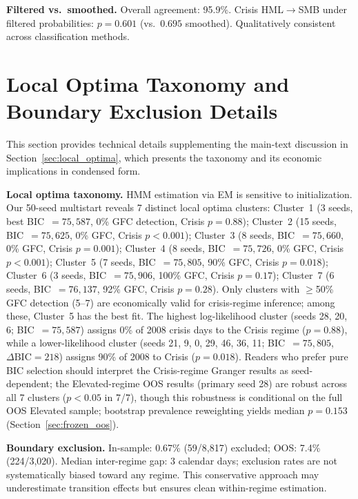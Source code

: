 \documentclass[sigconf,anonymous]{acmart}
\begin{document}
\textbf{Filtered vs.\ smoothed.} Overall agreement: 95.9\%.
Crisis HML$\to$SMB under filtered probabilities: $p = 0.601$ (vs.\ $0.695$ smoothed).
Qualitatively consistent across classification methods.

\section{Local Optima Taxonomy and Boundary Exclusion Details}
\label{app:optima}

This section provides technical details supplementing the main-text discussion in Section~\ref{sec:local_optima},
which presents the taxonomy and its economic implications in condensed form.

\textbf{Local optima taxonomy.}
HMM estimation via EM is sensitive to initialization. Our 50-seed multistart
reveals 7 distinct local optima clusters:
Cluster~1 (3 seeds, best BIC~$= 75{,}587$, 0\% GFC detection, Crisis $p = 0.88$);
Cluster~2 (15 seeds, BIC~$= 75{,}625$, 0\% GFC, Crisis $p < 0.001$);
Cluster~3 (8 seeds, BIC~$= 75{,}660$, 0\% GFC, Crisis $p = 0.001$);
Cluster~4 (8 seeds, BIC~$= 75{,}726$, 0\% GFC, Crisis $p < 0.001$);
Cluster~5 (7 seeds, BIC~$= 75{,}805$, 90\% GFC, Crisis $p = 0.018$);
Cluster~6 (3 seeds, BIC~$= 75{,}906$, 100\% GFC, Crisis $p = 0.17$);
Cluster~7 (6 seeds, BIC~$= 76{,}137$, 92\% GFC, Crisis $p = 0.28$).
Only clusters with $\geq$50\% GFC detection (5--7) are economically valid for
crisis-regime inference; among these, Cluster~5 has the best fit.
The highest log-likelihood cluster (seeds 28, 20, 6; BIC~$= 75{,}587$)
assigns 0\% of 2008 crisis days to the Crisis regime ($p = 0.88$),
while a lower-likelihood cluster (seeds 21, 9, 0, 29, 46, 36, 11;
BIC~$= 75{,}805$, $\Delta\text{BIC} = 218$) assigns 90\% of 2008 to Crisis
($p = 0.018$). Readers who prefer pure BIC selection should interpret the
Crisis-regime Granger results as seed-dependent; the Elevated-regime OOS results
(primary seed 28) are robust across all 7 clusters ($p < 0.05$ in 7/7),
though this robustness is conditional on the full OOS Elevated sample;
bootstrap prevalence reweighting yields median $p = 0.153$
(Section~\ref{sec:frozen_oos}).

\textbf{Boundary exclusion.}
In-sample: 0.67\% (59/8,817) excluded; OOS: 7.4\% (224/3,020).
Median inter-regime gap: 3 calendar days; exclusion rates are not
systematically biased toward any regime. This conservative approach
may underestimate transition effects but ensures clean within-regime estimation.


\end{document}
